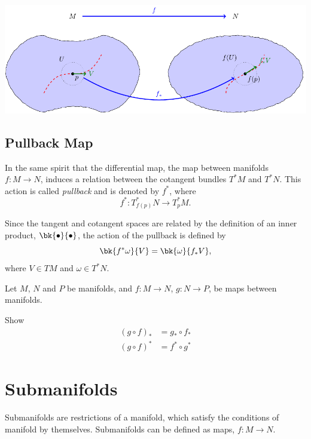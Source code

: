 \begin{center}
  \includegraphics[scale=1]{Pict/tikz-diffmap.pdf}
\end{center}

\subsection{Pullback Map}

In the same spirit that the differential map, the map between manifolds $f:M\to N$, induces a relation between the cotangent bundles $T^*M$ and $T^*N$. This action is called \emph{pullback} 
and is denoted by $f^*$, where
\begin{equation}
  f^*: T^*_{f(p)}N \to T^*_p M.
\end{equation}

Since the tangent and cotangent spaces are related by the definition of an inner product, $\bk{\bullet}{\bullet}$, the action of the pullback is defined by 
\begin{equation}
  \bk{f^*\omega}{V} = \bk{\omega}{f_*V},
\end{equation}
where $V \in TM$ and $\omega \in T^*N$.

\begin{Ebox}
  Let $M$, $N$ and $P$ be manifolds, and $ f:M\to N$, $g:N\to P$,  be maps between manifolds. 

  Show
  \begin{align*}
    (g\circ f)_* &= g_*\circ f_*\\
    (g\circ f)^* &= f^*\circ g^*
  \end{align*}
\end{Ebox}

\section{Submanifolds}

Submanifolds are restrictions of a manifold, which satisfy the conditions of manifold by themselves. Submanifolds can be defined as maps, $f:M \to N$.

